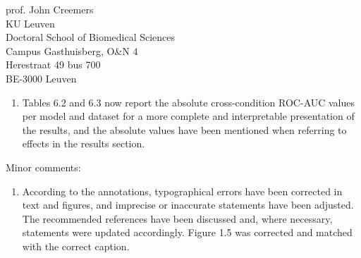\documentclass{letter}
\begin{document}
\begin{letter}{%
	prof. John Creemers \\
	KU Leuven \\
	Doctoral School of Biomedical Sciences \\
	Campus Gasthuisberg, O\&N 4 \\
	Herestraat 49 bus 700 \\
	BE-3000 Leuven

}
\begin{enumerate}
	the analyses for other comparison methods were not re-run
	by us as reported, but performances were
	taken from the MOABB benchmark database~\cite{Chevallier2024}.
	However, this source provided only the aggregated performance metrics
	and not the metrics per subject, session and cross-validation fold,
	hence we could not perform relevant statistical comparison with these
	comparison models.
\item Tables 6.2 and 6.3 now report the absolute cross-condition ROC-AUC values
  per model and dataset for a more complete and interpretable presentation of
    the results, and the absolute values have been mentioned when referring to
    effects in the results section.
\end{enumerate}
Minor comments:
\begin{enumerate}
	\item According to the annotations, typographical errors have been
	corrected in text and figures, and imprecise or inaccurate statements have been adjusted.
	The recommended references have been discussed and, where necessary,
	statements were updated accordingly.
  Figure 1.5 was corrected and matched with the correct caption.
\end{enumerate}


\end{letter}
\end{document}
